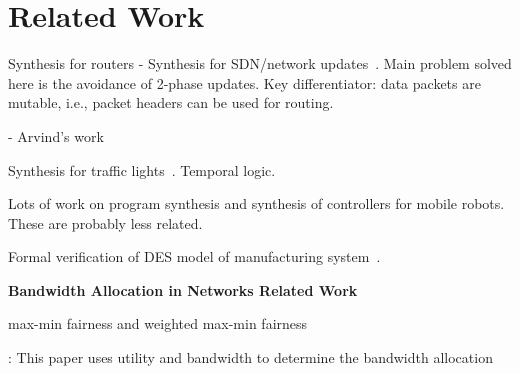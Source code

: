 \section{Related Work}
\label{sec:related}
Synthesis for routers
- Synthesis for SDN/network updates~\cite{McClurg:2015PLDI}. Main problem solved here is the avoidance of 2-phase updates.
Key differentiator: data packets are mutable, i.e., packet headers can be used for routing. 

- Arvind's work

Synthesis for traffic lights~\cite{coogan2017formal}.
Temporal logic.

Lots of work on program synthesis and synthesis of controllers for mobile robots. These are probably less related.


Formal verification of DES model of manufacturing system~\cite{ZhangKLMA13}.


\noindent
\textbf{Bandwidth Allocation in Networks Related Work}\\
\cite{chou2009optimal}

max-min fairness and weighted max-min fairness


\cite{cao1999utility}: This paper uses utility and bandwidth to determine the bandwidth allocation